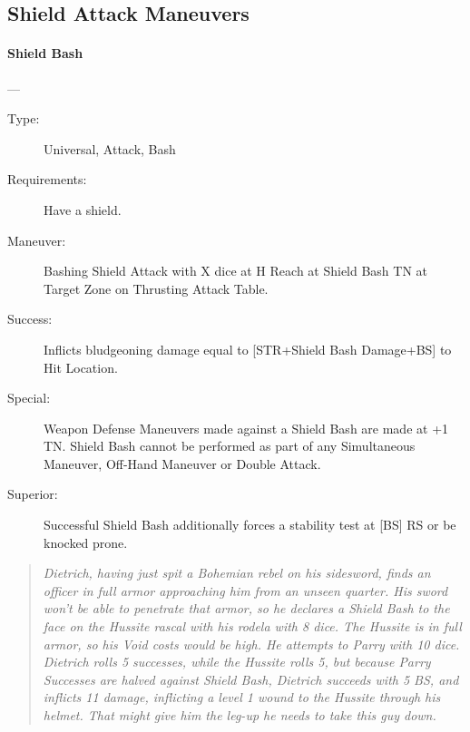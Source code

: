 \documentclass[oneside,11pt,english]{book}
\begin{document}
\subsection{Shield Attack Maneuvers}
\paragraph{\large\label{man:Shield Bash}Shield Bash}---\quad{\large[X]}
\vspace{-10pt}\begin{description} 
\item [Type:] Universal, Attack, Bash 
\item [Requirements:] Have a shield. 
\item [Maneuver:] Bashing Shield Attack with X dice at H Reach at Shield Bash TN at Target Zone on 
  Thrusting Attack Table. 
\item [Success:] Inflicts bludgeoning damage equal to [STR+Shield Bash Damage+BS] to Hit Location. 
\item [Special:] Weapon Defense Maneuvers made against a Shield Bash are made at +1 TN. Shield Bash cannot 
  be performed as part of any Simultaneous Maneuver, Off-Hand Maneuver or Double Attack. 
\item [Superior:] Successful Shield Bash additionally forces a stability test at [BS] RS or be knocked prone. 
\end{description}
\begin{quotation}
  \emph{Dietrich, having just spit a Bohemian rebel on his sidesword, finds an
    officer in full armor approaching him from an unseen quarter. His sword
    won’t be able to penetrate that armor, so he declares a Shield Bash to the
    face on the Hussite rascal with his rodela with 8 dice. The Hussite is in
    full armor, so his Void costs would be high. He attempts to Parry with 10
    dice. Dietrich rolls 5 successes, while the Hussite rolls 5, but because
    Parry Successes are halved against Shield Bash, Dietrich succeeds with 5 BS,
    and inflicts 11 damage, inflicting a level 1 wound to the Hussite through
    his helmet. That might give him the leg-up he needs to take this guy down.} 
\end{quotation}
\end{document}

